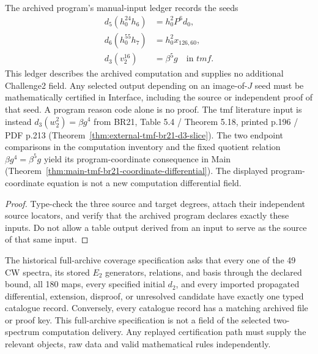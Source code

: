 \begin{proposition}
  \label{prop:appendix-manual-inputs}
  \notready
  The archived program's manual-input ledger records the seeds
  \[
  \begin{aligned}
    d_5(h_0^{24}h_6)&=h_0^2P^6d_0,\\
    d_6(h_0^{55}h_7)&=h_0^2x_{126,60},\\
    d_3(v_2^{16})&=\beta^5g\quad\text{in }tmf.
  \end{aligned}
  \]
  This ledger describes the archived computation and supplies no additional
  Challenge2 field. Any selected output depending on an image-of-$J$ seed
  must be mathematically certified in Interface, including the source or
  independent proof of that seed. A program reason code alone is no proof.
  The tmf literature input is instead $d_3(w_2^2)=\beta g^4$ from BR21,
  Table 5.4 / Theorem 5.18, printed p.196 / PDF p.213
  (Theorem~\ref{thm:external-tmf-br21-d3-slice}). The two endpoint comparisons
  in the computation inventory and the fixed quotient relation $\beta g^4=\beta^5g$ yield its
  program-coordinate consequence in Main
  (Theorem~\ref{thm:main-tmf-br21-coordinate-differential}). The displayed
  program-coordinate equation is not a new computation differential field.
\end{proposition}

\begin{proof}
  Type-check the three source and target degrees, attach their independent
  source locators, and verify that the archived program declares exactly these
  inputs.  Do not allow a table output derived from an input to serve as the
  source of that same input.
\end{proof}

\begin{theorem}
  \label{thm:lin-computation-catalogues-complete}
  \notready
  The historical full-archive coverage specification asks that every one of the 49 CW spectra, its stored
  $E_2$ generators, relations, and basis through the declared bound, all 180
  maps, every specified initial $d_2$, and every imported propagated
  differential, extension, disproof, or unresolved candidate have exactly one
  typed catalogue record.  Conversely, every catalogue record has a matching
  archived file or proof key.  This full-archive specification is not a field of the selected two-spectrum
  computation delivery. Any replayed certification path must supply the
  relevant objects, raw data and valid mathematical rules independently.
\end{theorem}


